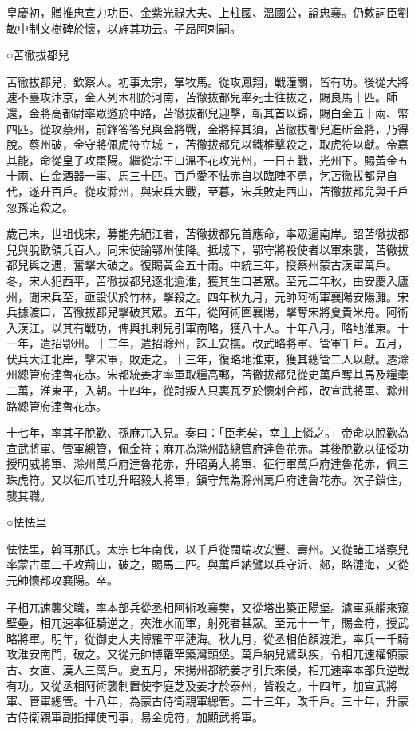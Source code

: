 \begin{pinyinscope}
 皇慶初，贈推忠宣力功臣、金紫光祿大夫、上柱國、溫國公，謚忠襄。仍敕詞臣劉敏中制文樹碑於懷，以旌其功云。子昂阿剌嗣。



 ○苫徹拔都兒



 苫徹拔都兒，欽察人。初事太宗，掌牧馬。從攻鳳翔，戰潼關，皆有功。後從大將速不臺攻汴京，金人列木柵於河南，苫徹拔都兒率死士往拔之，賜良馬十匹。師還，金將高都尉率眾邀於中路，苫徹拔都兒迎擊，斬其首以歸，賜白金五十兩、幣四匹。從攻蔡州，前鋒答答兒與金將戰，金將捽其須，苫徹拔都兒進斫金將，乃得脫。蔡州破，金守將佩虎符立城上，苫徹拔都兒以鐵椎擊殺之，取虎符以獻。帝嘉其能，命從皇子攻棗陽。繼從宗王口溫不花攻光州，一日五戰，光州下。賜黃金五十兩、白金酒器一事、馬三十匹。百戶愛不怯赤自以臨陣不勇，乞苫徹拔都兒自代，遂升百戶。從攻滁州，與宋兵大戰，至暮，宋兵敗走西山，苫徹拔都兒與千戶忽孫追殺之。



 歲己未，世祖伐宋，募能先絕江者，苫徹拔都兒首應命，率眾逼南岸。詔苫徹拔都兒與脫歡領兵百人。同宋使諭鄂州使降。抵城下，鄂守將殺使者以軍來襲，苫徹拔都兒與之遇，奮擊大破之。復賜黃金五十兩。中統三年，授蔡州蒙古漢軍萬戶。冬，宋人犯西平，苫徹拔都兒逐北逾淮，獲其生口甚眾。至元二年秋，由安慶入廬州，聞宋兵至，亟設伏於竹林，擊殺之。四年秋九月，元帥阿術軍襄陽安陽灘。宋兵據渡口，苫徹拔都兒擊破其眾。五年，從阿術圍襄陽，擊奪宋將夏貴米舟。阿術入漢江，以其有戰功，俾與扎剌兒引軍南略，獲八十人。十年八月，略地淮東。十一年，遣招鄂州。十二年，遣招滁州，誅王安撫。改武略將軍、管軍千戶。五月，伏兵大江北岸，擊宋軍，敗走之。十三年，復略地淮東，獲其總管二人以獻。遷滁州總管府達魯花赤。宋都統姜才率軍取糧高郵，苫徹拔都兒從史萬戶奪其馬及糧橐二萬，淮東平，入朝。十四年，從討叛人只裏瓦歹於懷剌合都，改宣武將軍、滁州路總管府達魯花赤。



 十七年，率其子脫歡、孫麻兀入見。奏曰：「臣老矣，幸主上憐之。」帝命以脫歡為宣武將軍、管軍總管，佩金符；麻兀為滁州路總管府達魯花赤。其後脫歡以征倭功授明威將軍、滁州萬戶府達魯花赤，升昭勇大將軍、征行軍萬戶府達魯花赤，佩三珠虎符。又以征爪哇功升昭毅大將軍，鎮守無為滁州萬戶府達魯花赤。次子鎖住，襲其職。



 ○怯怯里



 怯怯里，斡耳那氏。太宗七年南伐，以千戶從闊端攻安豐、壽州。又從諸王塔察兒率蒙古軍二千攻荊山，破之，賜馬二匹。與萬戶納鷿以兵守沂、郯，略漣海，又從元帥懷都攻襄陽。卒。



 子相兀速襲父職，率本部兵從丞相阿術攻襄樊，又從塔出築正陽堡。瀘軍乘艦來窺壁壘，相兀速率征騎逆之，夾淮水而軍，射死者甚眾。至元十一年，賜金符，授武略將軍。明年，從御史大夫博羅罕平漣海。秋九月，從丞相伯顏渡淮，率兵一千騎攻淮安南門，破之。又從元帥博羅罕築灣頭堡。萬戶納兒鷿臥疾，令相兀速權領蒙古、女直、漢人三萬戶。夏五月，宋揚州都統姜才引兵來侵，相兀速率本部兵逆戰有功。又從丞相阿術襲制置使李庭芝及姜才於泰州，皆殺之。十四年，加宣武將軍、管軍總管。十八年，為蒙古侍衛親軍總管。二十三年，改千戶。三十年，升蒙古侍衛親軍副指揮使司事，易金虎符，加顯武將軍。




\end{pinyinscope}
